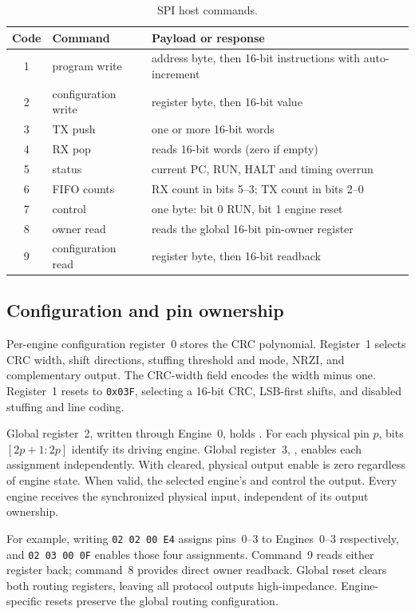 \documentclass[11pt]{article}
\newcommand{\sig}[1]{\texttt{\detokenize{#1}}}
\begin{document}
\begin{table}[!htbp]
\centering\small
\caption{SPI host commands.}\label{tab:cmds}
\begin{tabularx}{\linewidth}{@{}clL@{}}
\toprule
Code & Command & Payload or response \\
 & program write & address byte, then 16-bit instructions with auto-increment \\
2 & configuration write & register byte, then 16-bit value \\
3 & TX push & one or more 16-bit words \\
4 & RX pop & reads 16-bit words (zero if empty) \\
5 & status & current PC, RUN, HALT and timing overrun \\
6 & FIFO counts & RX count in bits 5--3; TX count in bits 2--0 \\
7 & control & one byte: bit 0 RUN, bit 1 engine reset \\
8 & owner read & reads the global 16-bit pin-owner register \\
9 & configuration read & register byte, then 16-bit readback \\
\bottomrule
\end{tabularx}
\end{table}

\subsection{Configuration and pin ownership}
Per-engine configuration register~0 stores the CRC polynomial. Register~1 selects CRC width, shift directions, stuffing threshold and mode, NRZI, and complementary output. The CRC-width field encodes the width minus one. Register~1 resets to \texttt{0x03F}, selecting a 16-bit CRC, LSB-first shifts, and disabled stuffing and line coding.

Global register~2, written through Engine~0, holds \sig{PIN_OWNER}. For each physical pin $p$, bits $[2p+1:2p]$ identify its driving engine. Global register~3, \sig{PIN_VALID}, enables each assignment independently. With \sig{PIN_VALID[p]} cleared, physical output enable is zero regardless of engine state. When valid, the selected engine's \sig{pout[p]} and \sig{poe[p]} control the output. Every engine receives the synchronized physical input, independent of its output ownership.

For example, writing \texttt{02 02 00 E4} assigns pins~0--3 to Engines~0--3 respectively, and \texttt{02 03 00 0F} enables those four assignments. Command~9 reads either register back; command~8 provides direct owner readback. Global reset clears both routing registers, leaving all protocol outputs high-impedance. Engine-specific resets preserve the global routing configuration.
\end{document}
